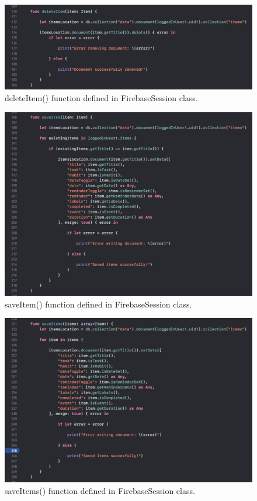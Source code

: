 \begin{figure}[H]
    \centering
    \includegraphics[width=\textwidth]{./graphics/Implementation/Dashboard/firebasesession1.png}
    \caption{deleteItem() function defined in FirebaseSession class.}
    \label{fig:firebasesession1_dashboard}
\end{figure}

\begin{figure}[H]
    \centering
    \includegraphics[width=\textwidth]{./graphics/Implementation/Dashboard/firebasesession2.png}
    \caption{saveItem() function defined in FirebaseSession class.}
    \label{fig:firebasesession2_dashboard}
\end{figure}

\begin{figure}[H]
    \centering
    \includegraphics[width=\textwidth]{./graphics/Implementation/Dashboard/firebasesession3.png}
    \caption{saveItems() function defined in FirebaseSession class.}
    \label{fig:firebasesession3_dashboard}
\end{figure}

